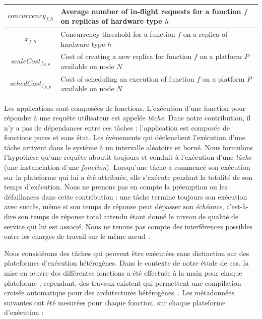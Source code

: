\begin{table}[t]
\begin{center}
\begin{tabular}{|c|L|}
    $concurrency_{f, h}$ & Average number of in-flight requests for a function $f$ on replicas of hardware type $h$ \\ \hline
    $x_{f, h}$ & Concurrency threshold for a function $f$ on a replica of hardware type $h$ \\ \hline
    $scaleCost_{{f}_{N, P}}$ & Cost of creating a new replica for function $f$ on a platform $P$ available on node $N$ \\ \hline
    $schedCost_{{f}_{N, P}}$ & Cost of scheduling an execution of function $f$ on a platform $P$ available on node $N$ \\ \hline
    \end{tabular}
    \label{table:herofake-notation}
    \end{center}
\end{table}

Les applications sont composées de fonctions. L'exécution d'une fonction pour répondre à une requête utilisateur est appelée \textit{tâche}. Dans notre contribution, il n'y a pas de dépendances entre ces tâches : l'application est composée de fonctions pures et sans état. Les évènements qui déclenchent l'exécution d'une tâche arrivent dans le système à un intervalle aléatoire et borné. Nous formulons l'hypothèse qu'une requête aboutit toujours et conduit à l'exécution d'une \textit{tâche} (une instanciation d'une \textit{fonction}). Lorsqu'une tâche a commencé son exécution sur la plateforme qui lui a été attribuée, elle s'exécute pendant la totalité de son temps d'exécution. Nous ne prenons pas en compte la préemption ou les défaillances dans cette contribution : une tâche termine toujours son exécution avec succès, même si son temps de réponse peut dépasser son \textit{échéance}, c'est-à-dire son temps de réponse total attendu étant donné le niveau de qualité de service qui lui est associé. Nous ne tenons pas compte des interférences possibles entre les charges de travail sur le même nœud~\cite{dartoisInvestigatingMachineLearning2021}. 

Nous considérons des tâches qui peuvent être exécutées sans distinction sur des plateformes d'exécution hétérogènes. Dans le contexte de notre étude de cas, la mise en œuvre des différentes fonctions a été effectuée à la main pour chaque plateforme ; cependant, des travaux existent qui permettent une compilation croisée automatique pour des architectures hétérogènes~\cite{hortaXartrekRuntimeExecution2021, 10.1145/3445814.3446699}. Les métadonnées suivantes ont été mesurées pour chaque fonction, sur chaque plateforme d'exécution :

